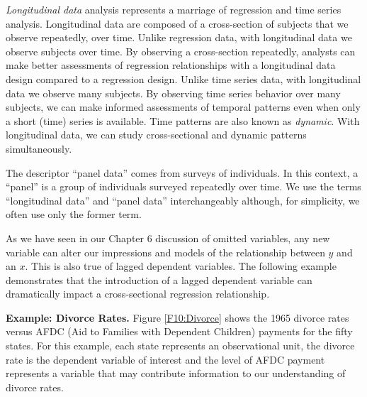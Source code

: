 \emph{Longitudinal data} analysis represents a marriage of
regression and time series analysis. Longitudinal data are composed
of a cross-section of subjects that we observe repeatedly, over
time. Unlike regression data, with longitudinal data we observe
subjects over time. By observing a cross-section repeatedly,
analysts can make better assessments of regression relationships
with a longitudinal data design compared to a regression design.
Unlike time series data, with longitudinal data we observe many
subjects. By observing time series behavior over many subjects, we
can make informed assessments of temporal patterns even when only a
short (time) series is available.  Time patterns are also known as
\emph{dynamic}. With longitudinal data, we can study cross-sectional
and dynamic patterns simultaneously.


The descriptor ``panel data'' comes from surveys of individuals. In
this context, a ``panel'' is a group of individuals surveyed
repeatedly over time. We use the terms ``longitudinal data'' and
``panel data'' interchangeably although, for simplicity, we often
use only the former term.

As we have seen in our Chapter 6 discussion of omitted variables,
any new variable can alter our impressions and models of the
relationship between $y$ and an $x$. This is also true of lagged
dependent variables. The following example demonstrates that the
introduction of a lagged dependent variable can dramatically impact
a cross-sectional regression relationship.

\linejed{}

\textbf{Example: Divorce Rates.}  Figure
\ref{F10:Divorce} shows the 1965 divorce rates versus AFDC (Aid to
Families with Dependent Children) payments for the fifty states. For
this example, each state represents an observational unit, the
divorce rate is the dependent variable of interest and the level of
AFDC payment represents a variable that may contribute information
to our understanding of divorce rates.

